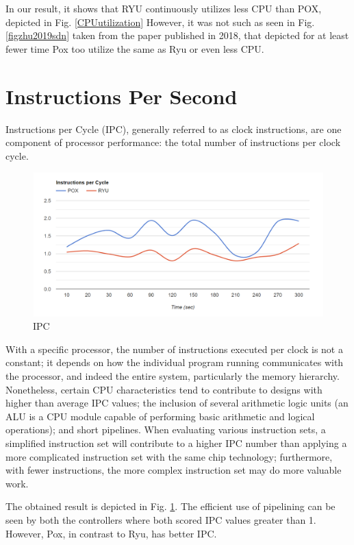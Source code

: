 In our result, it shows that RYU continuously utilizes less CPU than POX, depicted in Fig. \ref{CPUutilization} However, it was not such as seen in Fig. \ref{figzhu2019sdn} taken from the paper published in 2018, that depicted for at least fewer time Pox too utilize the same as Ryu or even less CPU. \cite{zhu2019sdn}

\section{Instructions Per Second}

Instructions per Cycle (IPC), generally referred to as clock instructions, are one component of processor performance: the total number of instructions per clock cycle.

\begin{figure}[!hbt]
    \centering
        \includegraphics[width=\textwidth,keepaspectratio]{images/ipc.png}
       \caption{IPC}
        \label{ipc}
\end{figure}

With a specific processor, the number of instructions executed per clock is not a constant; it depends on how the individual program running communicates with the processor, and indeed the entire system, particularly the memory hierarchy. Nonetheless, certain CPU characteristics tend to contribute to designs with higher than average IPC values; the inclusion of several arithmetic logic units (an ALU is a CPU module capable of performing basic arithmetic and logical operations); and short pipelines. When evaluating various instruction sets, a simplified instruction set will contribute to a higher IPC number than applying a more complicated instruction set with the same chip technology; furthermore, with fewer instructions, the more complex instruction set may do more valuable work. 

The obtained result is depicted in Fig. \ref{ipc}. The efficient use of pipelining can be seen by both the controllers where both scored IPC values greater than 1. However, Pox, in contrast to Ryu, has better IPC.

